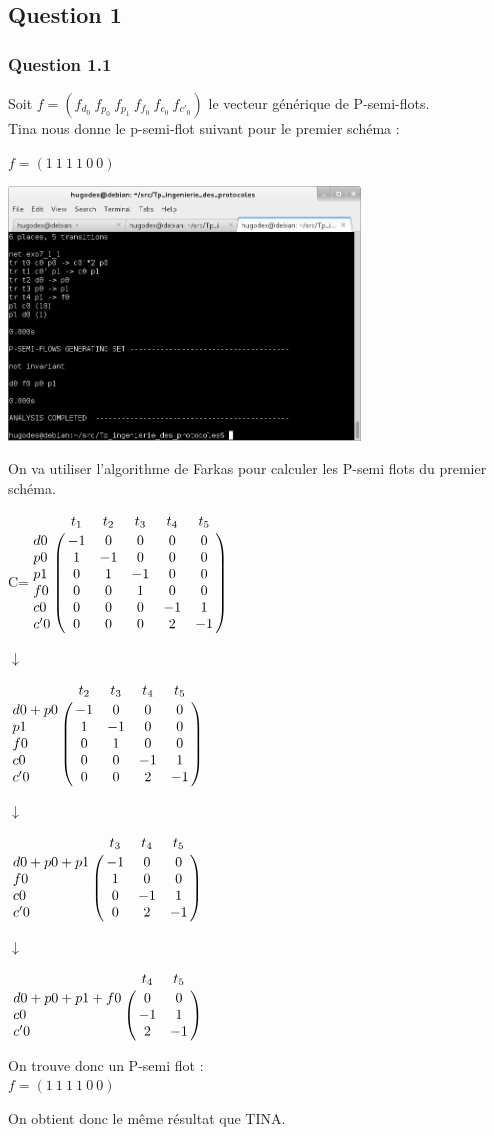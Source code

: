 \subsection{Question 1}
\subsubsection{Question 1.1}

Soit $f=(f_{d_0}\ f_{p_0}\ f_{p_1}\ f_{f_0}\ f_{c_0}\ f_{c'_0})$ le vecteur générique de P-semi-flots.\\
Tina nous donne le p-semi-flot suivant pour le premier schéma :\\
\begin{center}
  $f= (1\ 1\ 1\ 1\ 0\ 0)$

\includegraphics[width=0.7\textwidth]{exo7/tina_7_1.png}\\

\end{center}

On va utiliser l'algorithme de Farkas pour calculer les P-semi flots du premier schéma.

\begin{center}

{\Huge C}\qquad =\qquad $\bordermatrix{
&t_1&t_2&t_3&t_4&t_5\cr
d0&-1&0&0&0&0\cr
p0&1&-1&0&0&0\cr
p1&0&1&-1&0&0\cr
f0&0&0&1&0&0\cr
c0&0&0&0&-1&1\cr
c'0&0&0&0&2&-1\cr
}$

{\Huge $\downarrow$}

$\bordermatrix{
&t_2&t_3&t_4&t_5\cr
d0+p0&-1&0&0&0\cr
p1&1&-1&0&0\cr
f0&0&1&0&0\cr
c0&0&0&-1&1\cr
c'0&0&0&2&-1\cr
}$

{\Huge $\downarrow$}

$\bordermatrix{
&t_3&t_4&t_5\cr
d0+p0+p1&-1&0&0\cr
f0&1&0&0\cr
c0&0&-1&1\cr
c'0&0&2&-1\cr
}$

{\Huge $\downarrow$}

$\bordermatrix{
&t_4&t_5\cr
d0+p0+p1+f0&0&0\cr
c0&-1&1\cr
c'0&2&-1\cr
}$


\vspace{1cm}

On trouve donc un P-semi flot :\\
$f = (1\ 1\ 1\ 1\ 0\ 0)$

On obtient donc le même résultat que TINA.

\end{center}



